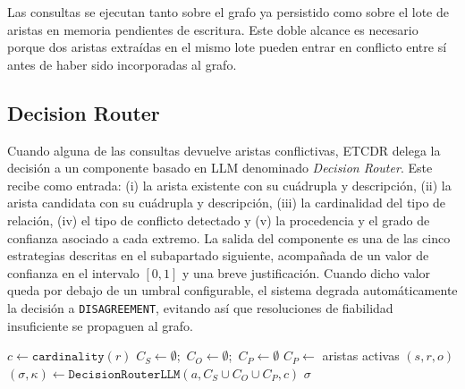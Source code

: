 Las consultas se ejecutan tanto sobre el grafo ya persistido como sobre el lote de aristas en memoria pendientes de escritura. Este doble alcance es necesario porque dos aristas extraídas en el mismo lote pueden entrar en conflicto entre sí antes de haber sido incorporadas al grafo.

\subsection{Decision Router}

Cuando alguna de las consultas devuelve aristas conflictivas, ETCDR delega la decisión a un componente basado en LLM denominado \emph{Decision Router}. Este recibe como entrada: (i) la arista existente con su cuádrupla y descripción, (ii) la arista candidata con su cuádrupla y descripción, (iii) la cardinalidad del tipo de relación, (iv) el tipo de conflicto detectado y (v) la procedencia y el grado de confianza asociado a cada extremo. La salida del componente es una de las cinco estrategias descritas en el subapartado siguiente, acompañada de un valor de confianza en el intervalo $[0, 1]$ y una breve justificación. Cuando dicho valor queda por debajo de un umbral configurable, el sistema degrada automáticamente la decisión a \texttt{DISAGREEMENT}, evitando así que resoluciones de fiabilidad insuficiente se propaguen al grafo.

\begin{algorithm}[H]
\caption{Resolución de un candidato en ETCDR}\label{alg:etcdr}
$c \gets \texttt{cardinality}(r)$\;
$C_S \gets \emptyset$;\, $C_O \gets \emptyset$;\, $C_P \gets \emptyset$\;
$C_P \gets$ aristas activas $(s, r, o)$\;
$(\sigma, \kappa) \gets \texttt{DecisionRouterLLM}(a, C_S \cup C_O \cup C_P, c)$\;
\Return $\sigma$\;
\end{algorithm}

